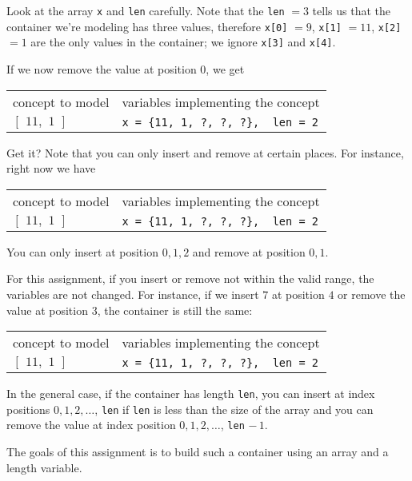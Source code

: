 Look at the array \verb!x! and \verb!len! carefully. Note that the
\verb!len! $= 3$ tells us that the container we're modeling has three values,
therefore \verb!x[0]! $= 9$, \verb!x[1]! $= 11$, \verb!x[2]! $= 1$ are the
only values in the container; we ignore \verb!x[3]! and \verb!x[4]!.

If we now remove the value at position $0$, we get

\begin{longtable}{ll}
concept to model & \hspace{3 cm}variables implementing the concept \\
$[\,\,11,\,\,1\,\,]$ & \hspace{3 cm}\verb!x = {11, 1, ?, ?, ?},  len = 2!
\end{longtable}

Get it? Note that you can only insert and remove at certain places.
For instance, right now we have

\begin{longtable}{ll}
concept to model & \hspace{3 cm}variables implementing the concept \\
$[\,\,11,\,\,1\,\,]$ & \hspace{3 cm}\verb!x = {11, 1, ?, ?, ?},  len = 2!
\end{longtable}

You can only insert at position $0, 1, 2$ and remove at position $0, 1$.

For this assignment, if you insert or remove not within the valid range, the
variables are not changed. For instance, if we insert $7$ at position $4$ or
remove the value at position $3$, the container is still the same:

\begin{longtable}{ll}
concept to model & \hspace{3 cm}variables implementing the concept \\
$[\,\,11,\,\,1\,\,]$ & \hspace{3 cm}\verb!x = {11, 1, ?, ?, ?},  len = 2!
\end{longtable}

In the general case, if the container has length \verb!len!, you can insert at
index positions $0, 1, 2, \dots$, \verb!len! if \verb!len! is less than the
size of the array and you can remove the value at index position
$0, 1, 2, \dots$, \verb!len! $-\,1$.

The goals of this assignment is to build such a container using an array and a
length variable. 

